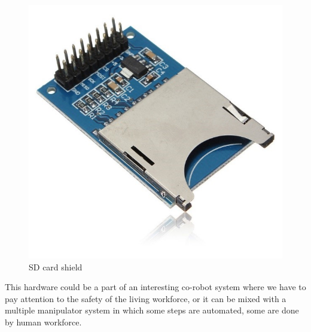		\begin{figure}[H]
			\centering
			\includegraphics[scale=0.75]{./images/sd_card_shield}
			\caption{SD card shield\cite{sd_card}}
		\end{figure}
		
		This hardware could be a part of an interesting co-robot system where we have to pay attention to the safety of the living workforce, or it can be mixed with a multiple manipulator system in which some steps are automated, some are done by human workforce.